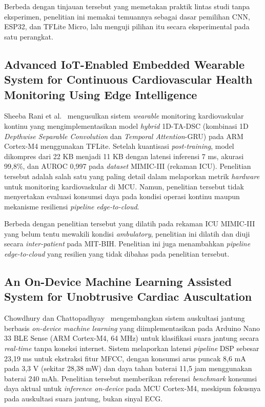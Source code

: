 Berbeda dengan tinjauan tersebut yang memetakan praktik lintas studi tanpa eksperimen, penelitian ini memakai temuannya sebagai dasar pemilihan CNN, ESP32, dan TFLite Micro, lalu menguji pilihan itu secara eksperimental pada satu perangkat.

\subsection{Advanced IoT-Enabled Embedded Wearable System for Continuous Cardiovascular Health Monitoring Using Edge Intelligence}

Sheeba Rani et al.~\cite{sheeba_rani_2026} mengusulkan sistem \textit{wearable} monitoring kardiovaskular kontinu yang mengimplementasikan model \textit{hybrid} 1D-TA-DSC (kombinasi 1D \textit{Depthwise Separable Convolution} dan \textit{Temporal Attention}-GRU) pada ARM Cortex-M4 menggunakan TFLite. Setelah kuantisasi \textit{post-training}, model dikompres dari 22 KB menjadi 11 KB dengan latensi inferensi 7 ms, akurasi 99,8\%, dan AUROC 0,997 pada \textit{dataset} MIMIC-III (rekaman ICU). Penelitian tersebut adalah salah satu yang paling detail dalam melaporkan metrik \textit{hardware} untuk monitoring kardiovaskular di MCU. Namun, penelitian tersebut tidak menyertakan evaluasi konsumsi daya pada kondisi operasi kontinu maupun mekanisme resiliensi \textit{pipeline} \textit{edge-to-cloud}.

Berbeda dengan penelitian tersebut yang dilatih pada rekaman ICU MIMIC-III yang belum tentu mewakili kondisi \textit{ambulatory}, penelitian ini dilatih dan diuji secara \textit{inter-patient} pada MIT-BIH. Penelitian ini juga menambahkan \textit{pipeline} \textit{edge-to-cloud} yang resilien yang tidak dibahas pada penelitian tersebut.

\subsection{An On-Device Machine Learning Assisted System for Unobtrusive Cardiac Auscultation}

Chowdhury dan Chattopadhyay~\cite{chowdhury_2023} mengembangkan sistem auskultasi jantung berbasis \textit{on-device machine learning} yang diimplementasikan pada Arduino Nano 33 BLE Sense (ARM Cortex-M4, 64 MHz) untuk klasifikasi suara jantung secara \textit{real-time} tanpa koneksi internet. Sistem melaporkan latensi \textit{pipeline} DSP sebesar 23,19 ms untuk ekstraksi fitur MFCC, dengan konsumsi arus puncak 8,6 mA pada 3,3 V (sekitar 28,38 mW) dan daya tahan baterai 11,5 jam menggunakan baterai 240 mAh. Penelitian tersebut memberikan referensi \textit{benchmark} konsumsi daya aktual untuk \textit{inference on-device} pada MCU Cortex-M4, meskipun fokusnya pada auskultasi suara jantung, bukan sinyal ECG.

